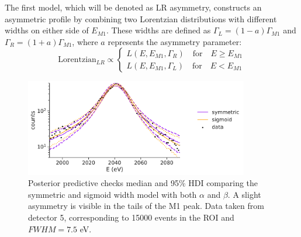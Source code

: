 
The first model, which will be denoted as LR asymmetry, constructs an asymmetric profile by combining two Lorentzian
distributions with different widths on either side of $E_{M1}$. These widths are defined as $\Gamma_L = (1-a)\Gamma_{M1}
$ and $\Gamma_R = (1+a)\Gamma_{M1}$, where $a$ represents the asymmetry parameter:
\begin{equation}
\text{Lorentzian}_{LR} \propto
\begin{cases}
L(E, E_{M1}, \Gamma_R) \quad \text{for} \quad E \geq E_{M1} \\
L(E, E_{M1}, \Gamma_L) \quad \text{for} \quad E < E_{M1}
\end{cases}
\end{equation}



\begin{figure}[t]
  \centering
  \includegraphics[width=0.87\textwidth]{figures/ch3/peaks/compred_0.pdf}
  \caption{Posterior predictive checks median and 95\% HDI comparing the symmetric and sigmoid width model with both $\alpha$
  and $\beta$. A slight asymmetry is visible in the tails of the M1 peak. Data taken from detector 5, corresponding to
15000 events in the ROI and $FWHM=7.5$ eV.}
  \label{fig:pred_asymm}
\end{figure}

